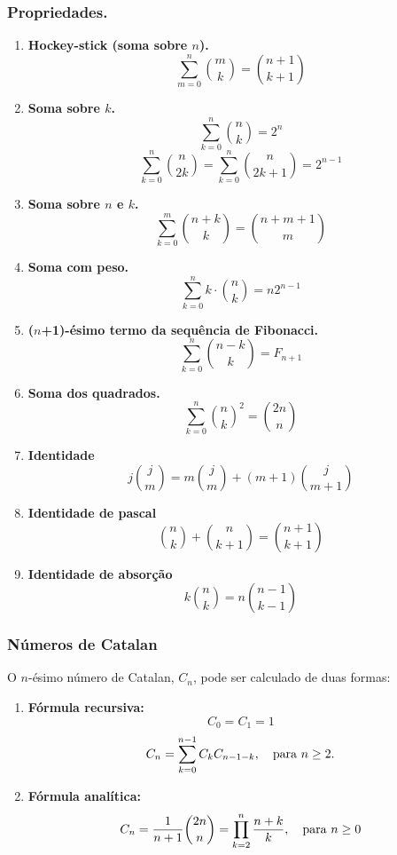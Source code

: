 \subsubsection*{Propriedades.}
\begin{multicols}{2}
    \begin{enumerate}
        \item \textbf{Hockey-stick (soma sobre $n$).}
        $$\sum_{m = 0}^{n} \binom{m}{k} = \binom{n+1}{k+1}$$

        \item \textbf{Soma sobre $k$.}
        $$\sum_{k = 0}^{n} \binom{n}{k} = 2^n$$
        $$\sum_{k = 0}^{n} \binom{n}{2k} = \sum_{k = 0}^{n} \binom{n}{2k+1} = 2^{n-1}$$

        \item \textbf{Soma sobre $n$ e $k$.}
        $$\sum_{k=0}^{m} \binom{n+k}{k} = \binom{n+m+1}{m}$$

        \item \textbf{Soma com peso.}
        $$\sum_{k=0}^{n} k\cdot \binom{n}{k} = n2^{n-1}$$

        \item \textbf{($n$+1)-ésimo termo da sequência de Fibonacci.}
        $$\sum_{k = 0}^{n} \binom{n-k}{k} = F_{n+1}$$

        \item \textbf{Soma dos quadrados.}
        $$\sum_{k = 0}^{n} \binom{n}{k}^2 = \binom{2n}{n}$$

  		\item \textbf{Identidade}
  		$$j \binom{j}{m} = m \binom{j}{m} + (m+1) \binom{j}{m+1}$$

 		\item \textbf{Identidade de pascal}
   		$$\binom{n}{k} + \binom{n}{k+1} = \binom{n+1}{k+1}$$

		\item \textbf{Identidade de absorção}
   		$$k \binom{n}{k} = n \binom{n-1}{k-1}$$
  		
    \end{enumerate}
\end{multicols}
 
\subsubsection{Números de Catalan}
O $n$-ésimo número de Catalan, $C_n$, pode ser calculado de duas formas:
\begin{enumerate}
    \item \textbf{Fórmula recursiva:} 
    $$C_0 = C_1 = 1$$
    $$C_n = \sum_{k = 0}^{n-1}C_kC_{n-1-k}, \quad \textnormal{para } n \ge 2.$$

    \item \textbf{Fórmula analítica:}
    $$C_n = \frac{1}{n+1} \binom{2n}{n} = \prod_{k=2}^{n} \frac{n+k}{k}, \quad \textnormal{para } n \ge 0$$
\end{enumerate}

